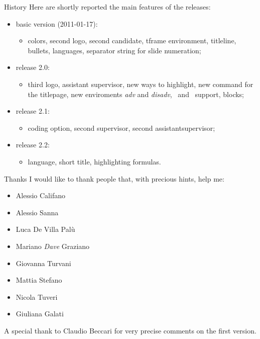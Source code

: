 \begin{tframe}{History}
Here are shortly reported the main features of the releases:
\begin{itemize}
\item basic version (2011-01-17):
\begin{itemize}
\item colors, second logo, second candidate, tframe environment, titleline, bullets, languages, separator string for slide numeration; 
\end{itemize}
\item release 2.0:
\begin{itemize}
\item third logo, assistant supervisor, new ways to highlight, new command for the titlepage, new enviroments \emph{adv} and \emph{disadv}, \XeTeX\, and \XeLaTeX\, support, blocks;
\end{itemize}
\item release 2.1:
\begin{itemize}
\item coding option, second supervisor, second assistantsupervisor;
\end{itemize}
\item release 2.2:
\begin{itemize}
\item language, short title, highlighting formulas.
\end{itemize}
\end{itemize}
\end{tframe}

\begin{tframe}{Thanks}
I would like to thank people that, with precious hints, help me:
\begin{itemize}
\item Alessio Califano
\item Alessio Sanna
\item Luca De Villa Palù
\item Mariano \emph{Dave} Graziano
\item Giovanna Turvani
\item Mattia Stefano
\item Nicola Tuveri
\item Giuliana Galati
\end{itemize}
A special thank to Claudio Beccari for very precise comments on the first version.
\end{tframe}

